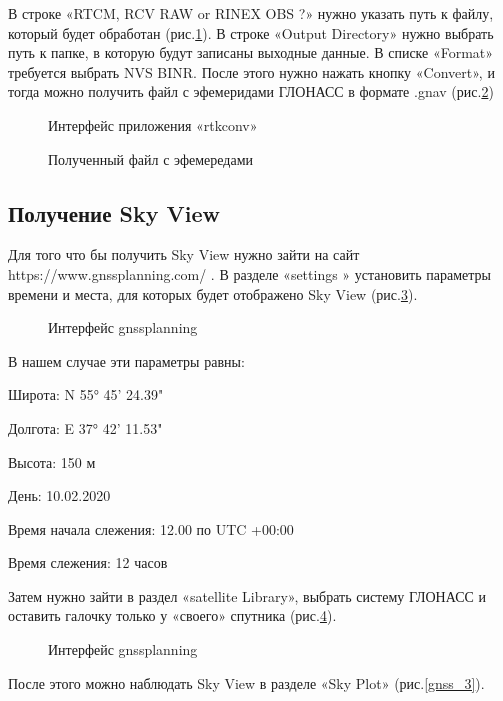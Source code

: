 \documentclass[]{article}
\begin{document}
 В строке «RTCM, RCV RAW or RINEX OBS  ?»   нужно указать путь к файлу, который будет обработан (рис.\ref{interf_rtkconv}).
 В строке «Output Directory» нужно выбрать путь к папке, в которую будут записаны выходные данные.
 В списке «Format» требуется  выбрать NVS BINR. После этого нужно нажать кнопку «Convert», и тогда можно получить файл  с эфемеридами ГЛОНАСС в формате .gnav (рис.\ref{efem_2})
 	\begin{figure}[h!]
 	
 	\caption{Интерфейс приложения «rtkconv»}
 	\label{interf_rtkconv}
 \end{figure}
	\begin{figure}[h!]
	
	\caption{Полученный файл с эфемередами}
	\label{efem_2}
\end{figure}
 
 \subsection{Получение Sky View}
 Для того что бы получить Sky View нужно зайти  на сайт https://www.gnssplanning.com/ . В разделе  «settings » установить параметры времени и места, для которых будет отображено Sky View (рис.\ref{gnss}).
 
 	\begin{figure}[h!]
 	
 	\caption{Интерфейс gnssplanning }
 	\label{gnss}
 \end{figure}




В нашем случае эти параметры равны:

Широта: N 55° 45' 24.39"

Долгота: E 37° 42' 11.53"

Высота: 150 м

День: 10.02.2020

Время начала слежения: 12.00 по UTC +00:00

Время слежения: 12 часов

Затем нужно зайти в раздел «satellite Library», выбрать систему ГЛОНАСС и оставить галочку только у «своего» спутника (рис.\ref{gnss_2}). 
 
 \begin{figure}[h!]
 	
 	\caption{Интерфейс gnssplanning }
 	\label{gnss_2}
 \end{figure}
 После этого можно наблюдать Sky View в разделе «Sky Plot» (рис.\ref{gnss_3}).
 
\end{document}
